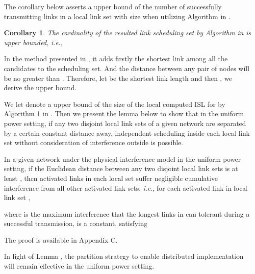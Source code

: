\documentclass[journal]{IEEEtran}
\begin{document}
The corollary below asserts a upper bound of  the number of successfully transmitting links in a local link set with size  when utilizing Algorithm  in \cite{S:phy9}.
\newtheorem{corollary}{Corollary}
\begin{corollary}
The cardinality of the resulted link scheduling set by Algorithm  in  \cite{S:phy9} is upper bounded, \emph{i.e.},

\end{corollary}
\begin{IEEEproof}
In the method presented in \cite{S:phy4}, it adds firstly the shortest link among all the candidates to the scheduling set. And the distance between any pair of nodes will be no greater than . Therefore, let   be the shortest link length and then  ,  we derive the upper bound.
\end{IEEEproof}

We let  denote a upper bound of the size of the local computed ISL for  by Algorithm 1 in \cite{S:phy9}. Then we present the lemma below to show that in the uniform power setting, if any two disjoint local link sets of a given network are separated by a certain constant distance away, independent scheduling inside each local link set without consideration of interference outside is possible.
\begin{lemma}
In a given network  under the physical interference model in the uniform power setting, if the Euclidean distance between any two disjoint local link sets is at least  , then activated links in each local set suffer negligible cumulative interference from all other activated link sets, \emph{i.e.}, for each activated link  in local link set ,
\vspace*{-0.25\baselineskip}

where  is the maximum interference that the longest links in  can tolerant during a successful transmission,   is a constant, satisfying
{\small{}}
\label{lemma5}
\end{lemma}
\begin{IEEEproof}
The proof is available in Appendix C.
\end{IEEEproof}

In light of Lemma , the partition strategy to enable distributed implementation will remain effective  in the uniform power setting.
\end{document}
